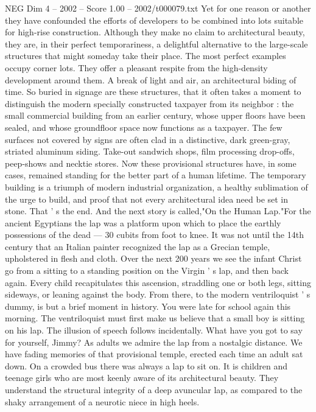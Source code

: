 \begin{textsample}{NEG Dim 4 – 2002 – Score 1.00 – 2002/t000079.txt}
Yet for one reason or another they have confounded the efforts of developers to be combined into lots suitable for high-rise construction.
Although they make no claim to architectural beauty, they are, in their perfect temporariness, a delightful alternative to the large-scale structures that might someday take their place.
The most perfect examples occupy corner lots.
They offer a pleasant respite from the high-density development around them.
A break of light and air, an architectural biding of time.
So buried in signage are these structures, that it often takes a moment to distinguish the modern specially constructed taxpayer from its neighbor : the small commercial building from an earlier century, whose upper floors have been sealed, and whose groundfloor space now functions as a taxpayer.
The few surfaces not covered by signs are often clad in a distinctive, dark green-gray, striated aluminum siding.
Take-out sandwich shops, film processing drop-offs, peep-shows and necktie stores.
Now these provisional structures have, in some cases, remained standing for the better part of a human lifetime.
The temporary building is a triumph of modern industrial organization, a healthy sublimation of the urge to build, and proof that not every architectural idea need be set in stone.
That ' s the end.
And the next story is called,"On the Human Lap."For the ancient Egyptians the lap was a platform upon which to place the earthly possessions of the dead — 30 cubits from foot to knee.
It was not until the 14th century that an Italian painter recognized the lap as a Grecian temple, upholstered in flesh and cloth.
Over the next 200 years we see the infant Christ go from a sitting to a standing position on the Virgin ' s lap, and then back again.
Every child recapitulates this ascension, straddling one or both legs, sitting sideways, or leaning against the body.
From there, to the modern ventriloquist ' s dummy, is but a brief moment in history.
You were late for school again this morning.
The ventriloquist must first make us believe that a small boy is sitting on his lap.
The illusion of speech follows incidentally.
What have you got to say for yourself, Jimmy?
As adults we admire the lap from a nostalgic distance.
We have fading memories of that provisional temple, erected each time an adult sat down.
On a crowded bus there was always a lap to sit on.
It is children and teenage girls who are most keenly aware of its architectural beauty.
They understand the structural integrity of a deep avuncular lap, as compared to the shaky arrangement of a neurotic niece in high heels.

\end{textsample}
